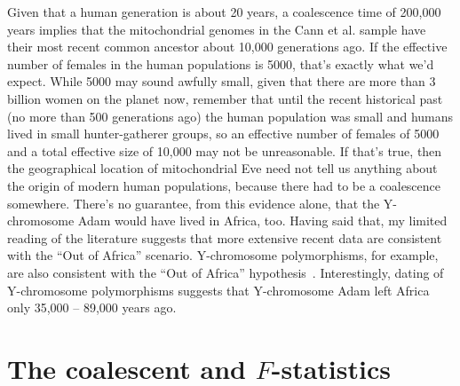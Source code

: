 Given that a human generation is about 20 years, a coalescence time of
200,000 years implies that the mitochondrial genomes in the Cann et
al. sample have their most recent common ancestor about 10,000
generations ago. If the effective number of females in the human
populations is 5000, that's exactly what we'd expect. While 5000 may
sound awfully small, given that there are more than 3 billion women on
the planet now, remember that until the recent historical past (no
more than 500 generations ago) the human population was small and
humans lived in small hunter-gatherer groups, so an effective number
of females of 5000 and a total effective size of 10,000 may not be
unreasonable. If that's true, then the geographical location of
mitochondrial Eve need not tell us anything about the origin of modern
human populations, because there had to be a coalescence
somewhere. There's no guarantee, from this evidence alone, that the
Y-chromosome Adam would have lived in Africa, too. Having said that,
my limited reading of the literature suggests that more extensive
recent data are consistent with the ``Out of Africa''
scenario. Y-chromosome polymorphisms, for example, are also consistent
with the ``Out of Africa''
hypothesis~\cite{Underhill-etal-2000}. Interestingly, dating of
Y-chromosome polymorphisms suggests that Y-chromosome Adam left
Africa only 35,000 -- 89,000 years ago.

\section*{The coalescent and $F$-statistics}

